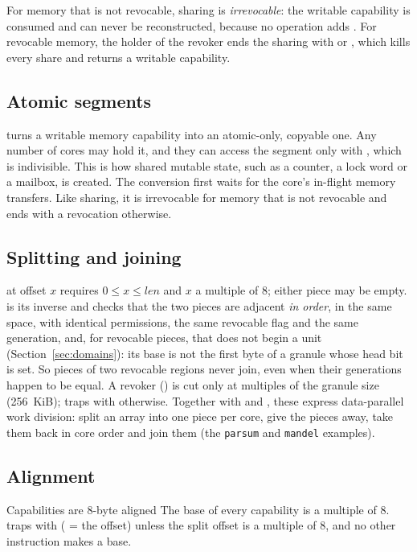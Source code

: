 For memory that is not revocable, sharing is \emph{irrevocable}: the writable capability is
consumed and can never be reconstructed, because no operation adds . For revocable memory,
the holder of the revoker ends the sharing with  or , which kills every
share and returns a writable capability.

\subsection{Atomic segments}
 turns a writable memory capability into an atomic-only, copyable one. Any number of
cores may hold it, and they can access the segment only with , which is indivisible. This
is how shared mutable state, such as a counter, a lock word or a mailbox, is created. The conversion
first waits for the core's in-flight memory transfers. Like sharing, it is irrevocable for memory
that is not revocable and ends with a revocation otherwise.

\subsection{Splitting and joining}
 at offset $x$ requires $0 \le x \le \textit{len}$ and $x$ a multiple of 8; either piece may
be empty. 
is its inverse and checks that the two pieces are adjacent \emph{in order}, in the same space, with
identical permissions, the same revocable flag and the same generation, and, for revocable pieces,
that  does not begin a unit (Section~\ref{sec:domains}): its base is not the first byte of a
granule whose head bit is set. So pieces of two revocable regions never join, even when their
generations happen to be equal. A revoker () is cut only at multiples of the granule size
(256~KiB);  traps with  otherwise. Together with
 and , these express data-parallel work division: split an array into one piece
per core, give the pieces away, take them back in core order and join them (the \texttt{parsum} and
\texttt{mandel} examples).

\subsection{Alignment}\label{sec:capalign}

\begin{rule*}{Capabilities are 8-byte aligned}
The base of every capability is a multiple of 8.  traps with  ( =
the offset) unless the split offset is a multiple of 8, and no other instruction makes a base.
\end{rule*}

